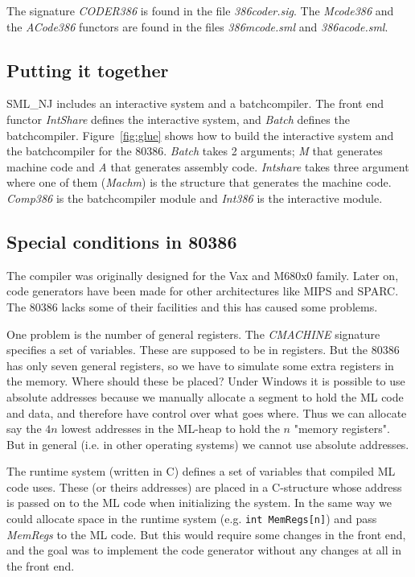 The signature {\em CODER386\/} is found in the file {\em
386coder.sig\/}. The {\em Mcode386\/} and the {\em ACode386\/}
functors are found in the files {\em 386mcode.sml\/} and {\em
386acode.sml\/}.

\subsection{Putting it together} \label{sec:glue}

SML\_NJ includes an interactive system and a batchcompiler. The front
end functor {\em IntShare\/} defines the interactive system, and {\em
Batch\/} defines the batchcompiler. Figure~\ref{fig:glue}
 shows how to build the interactive system and the
batchcompiler for the 80386.  {\em Batch} takes 2 arguments; {\em M}
that generates machine code and {\em A} that generates assembly code.
{\em Intshare} takes three argument where one of them ({\em Machm\/})
is the structure that generates the machine code. {\em Comp386} is the
batchcompiler module and {\em Int386} is the interactive module.

\subsection{Special conditions in 80386}

The compiler was originally designed for the Vax and M680x0 family.
Later on, code generators have been made for other architectures like
MIPS and SPARC. The 80386 lacks some of their facilities and this has
caused some problems.

One problem is the number of general registers. The {\em CMACHINE\/}
signature specifies a set of variables. These are supposed to be in
registers. But the 80386 has only seven general registers, so we have
to simulate some extra registers in the memory. Where should these be
placed? Under Windows it is possible to use absolute addresses because
we manually allocate a segment to hold the ML code and data, and
therefore have control over what goes where. Thus we can allocate say
the $4n$ lowest addresses in the ML-heap to hold the $n$ "memory
registers". But in general (i.e. in other operating systems) we cannot
use absolute addresses.

The runtime system (written in C) defines a set of variables that
compiled ML code uses. These (or theirs addresses) are placed in a
C-structure whose address is passed on to the ML code when
initializing the system. In the same way we could allocate space in
the runtime system (e.g.  {\tt\mbox{int MemRegs[n]}}) and pass {\em
MemRegs\/} to the ML code. But this would require some changes in the
front end, and the goal was to implement the code generator without
any changes at all in the front end.

